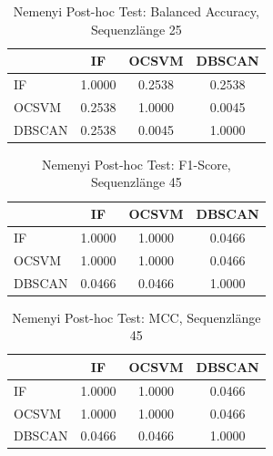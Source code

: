 \documentclass[a4paper,12pt]{article}
\begin{document}
	\begin{table}[H]
		\centering
		\caption{Nemenyi Post-hoc Test: Balanced Accuracy, Sequenzlänge 25}
		\begin{tabular}{lccc}
			\hline
			& IF & OCSVM & DBSCAN \\
			\hline
			IF      & 1.0000 & 0.2538 & 0.2538 \\
			OCSVM   & 0.2538 & 1.0000 & 0.0045 \\
			DBSCAN  & 0.2538 & 0.0045 & 1.0000 \\
			\hline
		\end{tabular}
	\end{table}
	
	\begin{table}[H]
		\centering
		\caption{Nemenyi Post-hoc Test: F1-Score, Sequenzlänge 45}
		\begin{tabular}{lccc}
			\hline
			& IF & OCSVM & DBSCAN \\
			\hline
			IF      & 1.0000 & 1.0000 & 0.0466 \\
			OCSVM   & 1.0000 & 1.0000 & 0.0466 \\
			DBSCAN  & 0.0466 & 0.0466 & 1.0000 \\
			\hline
		\end{tabular}
	\end{table}
	
	\begin{table}[H]
		\centering
		\caption{Nemenyi Post-hoc Test: MCC, Sequenzlänge 45}
		\begin{tabular}{lccc}
			\hline
			& IF & OCSVM & DBSCAN \\
			\hline
			IF      & 1.0000 & 1.0000 & 0.0466 \\
			OCSVM   & 1.0000 & 1.0000 & 0.0466 \\
			DBSCAN  & 0.0466 & 0.0466 & 1.0000 \\
			\hline
		\end{tabular}
	\end{table}
	
\end{document}
